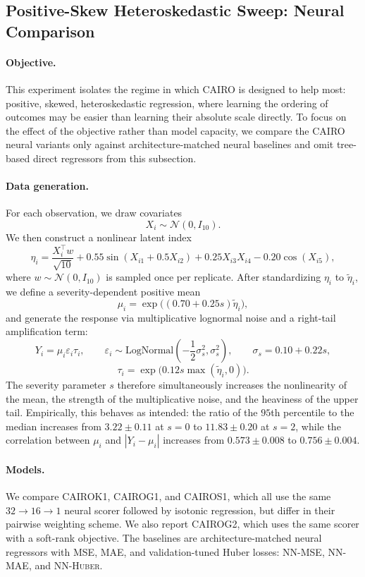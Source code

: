 
\subsection{Positive-Skew Heteroskedastic Sweep: Neural Comparison}
\label{sec:positive-skew-neural}

\paragraph{Objective.}
This experiment isolates the regime in which CAIRO is designed to help most: positive, skewed, heteroskedastic regression, where learning the ordering of outcomes may be easier than learning their absolute scale directly. To focus on the effect of the objective rather than model capacity, we compare the CAIRO neural variants only against architecture-matched neural baselines and omit tree-based direct regressors from this subsection.

\paragraph{Data generation.}
For each observation, we draw covariates
\[
X_i \sim \mathcal{N}(0, I_{10}).
\]
We then construct a nonlinear latent index
\[
\eta_i
=
\frac{X_i^\top w}{\sqrt{10}}
+ 0.55 \sin(X_{i1} + 0.5 X_{i2})
+ 0.25 X_{i3} X_{i4}
- 0.20 \cos(X_{i5}),
\]
where \(w \sim \mathcal{N}(0, I_{10})\) is sampled once per replicate. After standardizing \(\eta_i\) to \(\tilde{\eta}_i\), we define a severity-dependent positive mean
\[
\mu_i = \exp\!\big((0.70 + 0.25s)\tilde{\eta}_i\big),
\]
and generate the response via multiplicative lognormal noise and a right-tail amplification term:
\[
Y_i
=
\mu_i \varepsilon_i \tau_i,
\qquad
\varepsilon_i \sim \mathrm{LogNormal}\!\left(-\frac{1}{2}\sigma_s^2,\sigma_s^2\right),
\qquad
\sigma_s = 0.10 + 0.22s,
\]
\[
\tau_i = \exp\!\big(0.12s \max(\tilde{\eta}_i, 0)\big).
\]
The severity parameter \(s\) therefore simultaneously increases the nonlinearity of the mean, the strength of the multiplicative noise, and the heaviness of the upper tail. Empirically, this behaves as intended: the ratio of the \(95\)th percentile to the median increases from \(3.22 \pm 0.11\) at \(s=0\) to \(11.83 \pm 0.20\) at \(s=2\), while the correlation between \(\mu_i\) and \(|Y_i-\mu_i|\) increases from \(0.573 \pm 0.008\) to \(0.756 \pm 0.004\).

\paragraph{Models.}
We compare \textsc{CAIROK1}, \textsc{CAIROG1}, and \textsc{CAIROS1}, which all use the same \(32 \rightarrow 16 \rightarrow 1\) neural scorer followed by isotonic regression, but differ in their pairwise weighting scheme. We also report \textsc{CAIROG2}, which uses the same scorer with a soft-rank objective. The baselines are architecture-matched neural regressors with MSE, MAE, and validation-tuned Huber losses: \textsc{NN-MSE}, \textsc{NN-MAE}, and \textsc{NN-Huber}.

